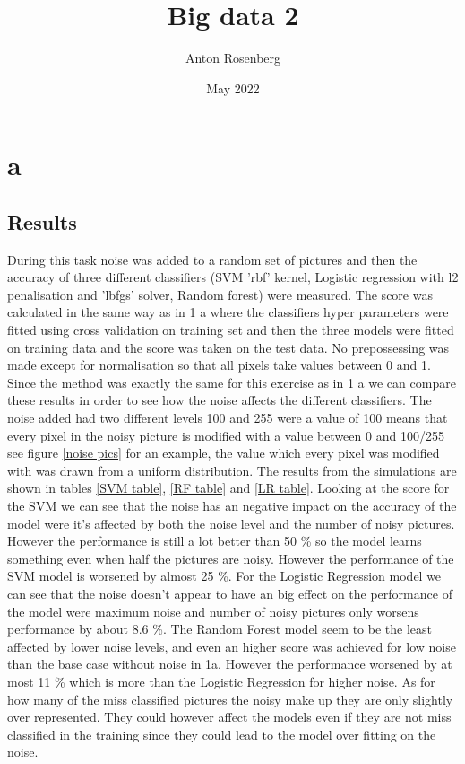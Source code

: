 \documentclass{article}
\title{Big data 2}
\author{Anton Rosenberg}
\date{May 2022}
\begin{document}
\maketitle
\newpage
\section{a}
\subsection{Results}
During this task noise was added to a random set of pictures and then the accuracy of three different classifiers (SVM 'rbf' kernel, Logistic regression with l2 penalisation and 'lbfgs' solver, Random forest) were measured. The score was calculated in the same way as in 1 a where the classifiers hyper parameters were fitted using cross validation on training set and then the three models were fitted on training data and the score was taken on the test data. No prepossessing was made except for normalisation so that all pixels take values between 0 and 1. Since the method was exactly the same for this exercise as in 1 a we can compare these results in order to see how the noise affects the different classifiers. The noise added had two different levels 100 and 255 were a value of 100 means that every pixel in the noisy picture is modified with a value between 0 and 100/255 see figure \ref{noise pics} for an example, the value which every pixel was modified with was drawn from a uniform distribution. The results from the simulations are shown in tables \ref{SVM table}, \ref{RF table} and \ref{LR table}. Looking at the score for the SVM we can see that the noise has an negative impact on the accuracy of the model were it's affected by both the noise level and the number of noisy pictures. However the performance is still a lot better than 50 \% so the model learns something even when half the pictures are noisy. However the performance of the SVM model is worsened by almost 25 \%. For the Logistic Regression model we can see that the noise doesn't appear to have an big effect on the performance of the model were maximum noise and number of noisy pictures only worsens performance by about 8.6 \%. The Random Forest model seem to be the least affected by lower noise levels, and even an higher score was achieved for low noise than the base case without noise in 1a. However the performance worsened by at most 11 \% which is more than the Logistic Regression for higher noise. As for how many of the miss classified pictures the noisy make up they are only slightly over represented. They could however affect the models even if they are not miss classified in the training since they could lead to the model over fitting on the noise.        
\end{document}
